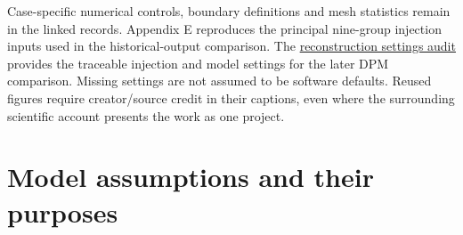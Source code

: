 Case-specific numerical controls, boundary definitions and mesh statistics remain in the linked records. Appendix E reproduces the principal nine-group injection inputs used in the historical-output comparison. The \href{../../../../experiments/phase-10-single-inlet-mesh-convergence/replication1600-settings-audit.md}{reconstruction settings audit} provides the traceable injection and model settings for the later DPM comparison. Missing settings are not assumed to be software defaults. Reused figures require creator/source credit in their captions, even where the surrounding scientific account presents the work as one project.

\section{Model assumptions and their purposes}

